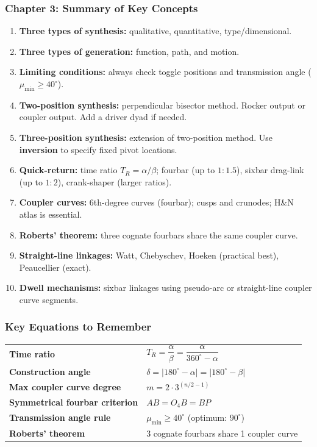 \documentclass[10pt,aspectratio=43]{beamer}
\begin{document}
\begin{frame}
\frametitle{Chapter 3: Summary of Key Concepts}

\begin{enumerate}
  \item \textbf{Three types of synthesis:} qualitative, quantitative, type/dimensional.
  \item \textbf{Three types of generation:} function, path, and motion.
  \item \textbf{Limiting conditions:} always check toggle positions and transmission angle ($\mu_{\min} \geq 40^\circ$).
  \item \textbf{Two-position synthesis:} perpendicular bisector method. Rocker output or coupler output. Add a driver dyad if needed.
  \item \textbf{Three-position synthesis:} extension of two-position method. Use \textbf{inversion} to specify fixed pivot locations.
  \item \textbf{Quick-return:} time ratio $T_R = \alpha/\beta$; fourbar (up to $1{:}1.5$), sixbar drag-link (up to $1{:}2$), crank-shaper (larger ratios).
  \item \textbf{Coupler curves:} 6th-degree curves (fourbar); cusps and crunodes; H\&N atlas is essential.
  \item \textbf{Roberts' theorem:} three cognate fourbars share the same coupler curve.
  \item \textbf{Straight-line linkages:} Watt, Chebyschev, Hoeken (practical best), Peaucellier (exact).
  \item \textbf{Dwell mechanisms:} sixbar linkages using pseudo-arc or straight-line coupler curve segments.
\end{enumerate}
\end{frame}

\begin{frame}
\frametitle{Key Equations to Remember}

\begin{yellowbox}
\begin{tabular}{@{}ll@{}}
\textbf{Time ratio} & $T_R = \dfrac{\alpha}{\beta} = \dfrac{\alpha}{360^\circ - \alpha}$ \\[8pt]
\textbf{Construction angle} & $\delta = |180^\circ - \alpha| = |180^\circ - \beta|$ \\[8pt]
\textbf{Max coupler curve degree} & $m = 2 \cdot 3^{(n/2-1)}$ \\[8pt]
\textbf{Symmetrical fourbar criterion} & $AB = O_4B = BP$ \\[8pt]
\textbf{Transmission angle rule} & $\mu_{\min} \geq 40^\circ$ (optimum: $90^\circ$) \\[8pt]
\textbf{Roberts' theorem} & 3 cognate fourbars share 1 coupler curve \\
\end{tabular}
\end{yellowbox}
\end{frame}
\end{document}
